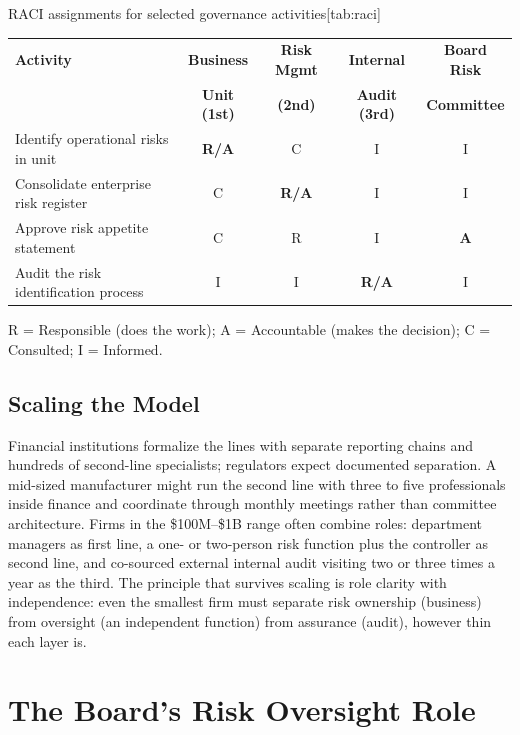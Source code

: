 \documentclass[11pt,openany]{book}
\begin{document}
\begin{ermtable}{RACI assignments for selected governance activities}[tab:raci]
\begin{tabular}{@{}p{1.9in}cccc@{}}
\toprule
\textbf{Activity} & \textbf{Business} & \textbf{Risk Mgmt} &
\textbf{Internal} & \textbf{Board Risk} \\
 & \textbf{Unit (1st)} & \textbf{(2nd)} & \textbf{Audit (3rd)} &
\textbf{Committee} \\
\midrule
Identify operational risks in unit & \textbf{R/A} & C & I & I \\
Consolidate enterprise risk register & C & \textbf{R/A} & I & I \\
Approve risk appetite statement & C & R & I & \textbf{A} \\
Audit the risk identification process & I & I & \textbf{R/A} & I \\
\bottomrule
\end{tabular}

\medskip
\footnotesize R = Responsible (does the work); A = Accountable (makes the
decision); C = Consulted; I = Informed.
\end{ermtable}

\subsection{Scaling the Model}

Financial institutions formalize the lines with separate reporting chains and
hundreds of second-line specialists; regulators expect documented separation.
A mid-sized manufacturer might run the second line with three to five
professionals inside finance and coordinate through monthly meetings rather
than committee architecture. Firms in the \$100M--\$1B range often combine
roles: department managers as first line, a one- or two-person risk function
plus the controller as second line, and co-sourced external internal audit
visiting two or three times a year as the third. The principle that survives
scaling is role clarity with independence: even the smallest firm must
separate risk ownership (business) from oversight (an independent function)
from assurance (audit), however thin each layer is.

\section{The Board's Risk Oversight Role}
\label{sec:board}
\end{document}
